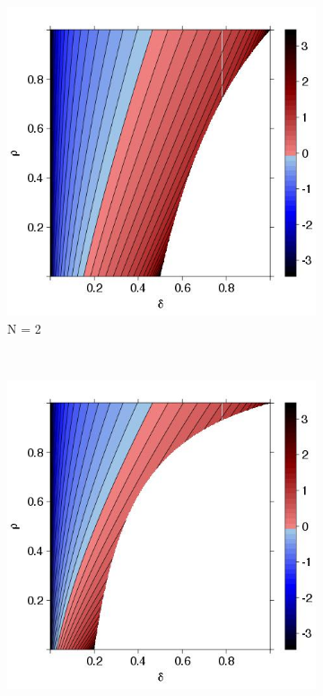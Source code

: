 \documentclass[11pt,twoside]{article}
\begin{document}
\begin{figure}
        \centering
        \begin{subfigure}[b]{0.32\textwidth}
                \includegraphics[width=\textwidth]{ExtremeN2.jpeg}
\caption{N = 2}	
\label{ExtremeN5}
        \end{subfigure}%
        ~ %
        \begin{subfigure}[b]{0.32\textwidth}
                \includegraphics[width=\textwidth]{ExtremeN5.jpeg}

\end{subfigure}
\end{figure}
\end{document}
